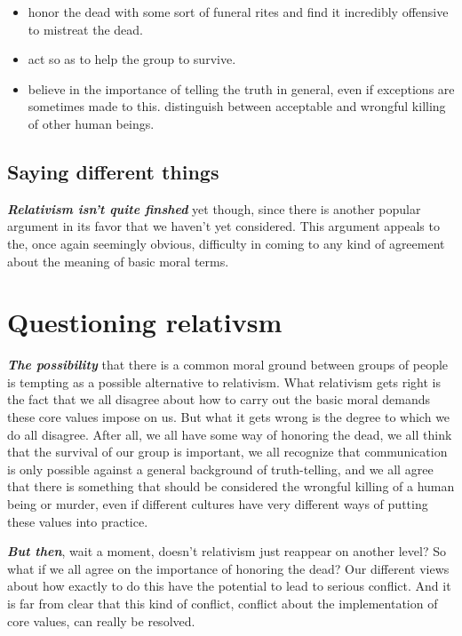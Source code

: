 \documentclass[]{book}
\makeatletter
\providecommand{\tightlist}{%
  \setlength{\itemsep}{0pt}\setlength{\parskip}{0pt}}
\newenvironment{kframe}{%
\medskip{}
\setlength{\fboxsep}{.8em}
 \def\at@end@of@kframe{}%
 \ifinner\ifhmode%
  \def\at@end@of@kframe{\end{minipage}}%
  \begin{minipage}{\columnwidth}%
 \fi\fi%
 \def\FrameCommand##1{\hskip\@totalleftmargin \hskip-\fboxsep
 \colorbox{shadecolor}{##1}\hskip-\fboxsep
     \hskip-\linewidth \hskip-\@totalleftmargin \hskip\columnwidth}%
 \MakeFramed {\advance\hsize-\width
   \@totalleftmargin\z@ \linewidth\hsize
   \@setminipage}}%
 {\par\unskip\endMakeFramed%
 \at@end@of@kframe}
\newenvironment{rmdblock}[1]
  {
  \begin{itemize}
  \renewcommand{\labelitemi}{
    \raisebox{-.7\height}[0pt][0pt]{
      {\setkeys{Gin}{width=3em,keepaspectratio}\texttt{[image: img/\#1]}}
    }
  }
  \setlength{\fboxsep}{1em}
  \begin{kframe}
  \item
  }
  {
  \end{kframe}
  \end{itemize}
  }
\newenvironment{rmdcaution}
  {\begin{rmdblock}{caution}}
  {\end{rmdblock}}
\makeatother
\begin{document}
\begin{itemize}
\tightlist
\item
  honor the dead with some sort of funeral rites and find it incredibly offensive to mistreat the dead.
\item
  act so as to help the group to survive.
\item
  believe in the importance of telling the truth in general, even if exceptions are sometimes made to this. distinguish between acceptable and wrongful killing of other human beings.
\end{itemize}

\hypertarget{saying-different-things}{%
\subsection{Saying different things}\label{saying-different-things}}

\textbf{\emph{Relativism isn't quite finshed}} yet though, since there is another popular argument in its favor that we haven't yet considered. This argument appeals to the, once again seemingly obvious, difficulty in coming to any kind of agreement about the meaning of basic moral terms.

\hypertarget{questioning-relativsm}{%
\section{Questioning relativsm}\label{questioning-relativsm}}

\textbf{\emph{The possibility}} that there is a common moral ground between groups of people is tempting as a possible alternative to relativism. What relativism gets right is the fact that we all disagree about how to carry out the basic moral demands these core values impose on us. But what it gets wrong is the degree to which we do all disagree. After all, we all have some way of honoring the dead, we all think that the survival of our group is important, we all recognize that communication is only possible against a general background of truth-telling, and we all agree that there is something that should be considered the wrongful killing of a human being or murder, even if different cultures have very different ways of putting these values into practice.

\begin{rmdcaution}
\textbf{\emph{But then}}, wait a moment, doesn't relativism just
reappear on another level? So what if we all agree on the importance of
honoring the dead? Our different views about how exactly to do this have
the potential to lead to serious conflict. And it is far from clear that
this kind of conflict, conflict about the implementation of core values,
can really be resolved.
\end{rmdcaution}
\end{document}
